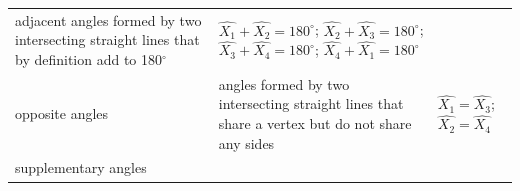 {\begin{tabular}[t]{|l|l|l|}
        adjacent angles formed by two intersecting straight lines that by definition add to 180\begin{math}{}^{\circ }\end{math} &
                  \begin{math}\hat{{X}_{1}}+\hat{{X}_{2}}={180}^{\circ }\end{math};
                  \begin{math}\hat{{X}_{2}}+\hat{{X}_{3}}={180}^{\circ }\end{math};
                  \begin{math}\hat{{X}_{3}}+\hat{{X}_{4}}={180}^{\circ }\end{math};
                  \begin{math}\hat{{X}_{4}}+\hat{{X}_{1}}={180}^{\circ }\end{math}
     \tabularnewline\cline{1-1}\cline{2-2}\cline{3-3}
        opposite angles &
        angles formed by two intersecting straight lines that share a vertex but do not share any sides &
                  \begin{math}\hat{{X}_{1}}=\hat{{X}_{3}}\end{math};
                  \begin{math}\hat{{X}_{2}}=\hat{{X}_{4}}\end{math}
     \tabularnewline\cline{1-1}\cline{2-2}\cline{3-3}
        supplementary angles &

\end{tabular}}
